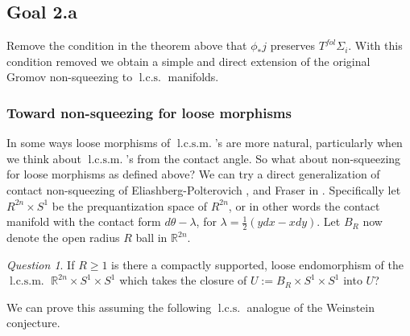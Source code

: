 \documentclass{amsart}
\numberwithin{equation}{section}
\theoremstyle{definition}
\theoremstyle{remark}
\newtheorem{question}{Question}
\DeclareMathOperator {\energy} {energy}
\DeclareMathOperator{\lcs}{l.c.s.}
\DeclareMathOperator{\lcsm}{l.c.s.m.}
\begin{document}
\subsection {Goal 2.a
}  Remove the condition in the theorem above that $\phi _{*}j $ preserves $T ^{fol} \Sigma _{i} $. With this condition removed we obtain a simple and direct extension of the original Gromov non-squeezing to $\lcs$ manifolds.
\subsubsection {Toward non-squeezing for loose morphisms} In some ways loose morphisms of $\lcsm$'s are more natural, particularly when we think about $\lcsm$'s from the contact angle.
So what about non-squeezing for loose morphisms as defined above? We can try a direct generalization of contact non-squeezing of Eliashberg-Polterovich \cite{citeEKPcontactnonsqueezing}, and Fraser in \cite{citeFraserNonsqueezing}.
Specifically let $R ^{2n}   \times S ^{1}  $ be the prequantization space of $R ^{2n} $, or in other words the contact manifold with the contact form $d\theta - \lambda$, for $\lambda = \frac{1}{2}(ydx - xdy)$. Let $B _{R} $ now denote the open radius $R$ ball in $\mathbb{R} ^{2n} $. 
\begin{question} \label{question:loose} If $R\geq 1$ is there a compactly supported, loose endomorphism of the $\lcsm$ $\mathbb{R} ^{2n} \times S ^{1} \times S ^{1}  $ which takes the closure of $U := B _{R} \times S ^{1} \times S ^{1}  $ into $U$? 
\end{question}
 We can prove this assuming the following $\lcs$ analogue of the Weinstein conjecture.
\end{document}
